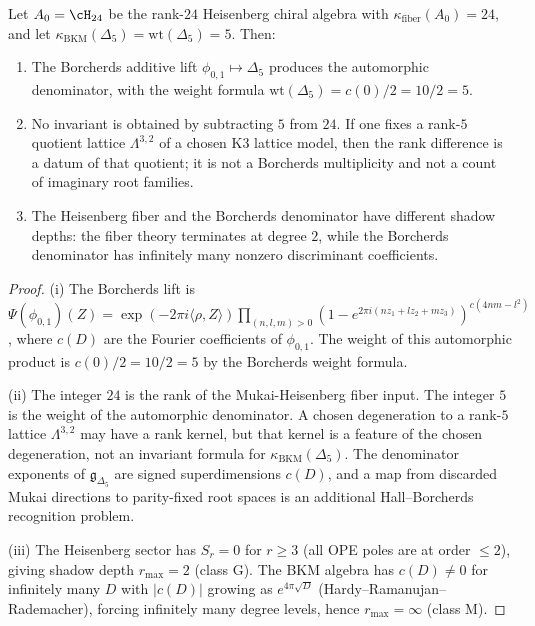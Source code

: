 \begin{proposition}
\label{prop:k3e-fiber-global}
Let $A_0 = \cH_{24}$ be the rank-$24$ Heisenberg chiral algebra with $\kappa_{\mathrm{fiber}}(A_0) = 24$, and let $\kappa_{\mathrm{BKM}}(\Delta_5) = \mathrm{wt}(\Delta_5) = 5$. Then:
\begin{enumerate}[label=(\roman*)]
 \item The Borcherds additive lift $\phi_{0,1} \mapsto \Delta_5$ produces the automorphic denominator, with the weight formula $\mathrm{wt}(\Delta_5) = c(0)/2 = 10/2 = 5$.
 \item No invariant is obtained by subtracting $5$ from $24$. If one fixes a rank-$5$ quotient lattice $\Lambda^{3,2}$ of a chosen K3 lattice model, then the rank difference is a datum of that quotient; it is not a Borcherds multiplicity and not a count of imaginary root families.
 \item The Heisenberg fiber and the Borcherds denominator have different shadow depths: the fiber theory terminates at degree $2$, while the Borcherds denominator has infinitely many nonzero discriminant coefficients.
\end{enumerate}
\end{proposition}

\begin{proof}
(i) The Borcherds lift is $\Psi(\phi_{0,1})(Z) = \exp(-2\pi i \langle \rho, Z \rangle) \prod_{(n,l,m) > 0}(1 - e^{2\pi i(nz_1 + lz_2 + mz_3)})^{c(4nm - l^2)}$, where $c(D)$ are the Fourier coefficients of $\phi_{0,1}$. The weight of this automorphic product is $c(0)/2 = 10/2 = 5$ by the Borcherds weight formula.

(ii) The integer $24$ is the rank of the Mukai-Heisenberg fiber input. The integer $5$ is the weight of the automorphic denominator. A chosen degeneration to a rank-$5$ lattice $\Lambda^{3,2}$ may have a rank kernel, but that kernel is a feature of the chosen degeneration, not an invariant formula for $\kappa_{\mathrm{BKM}}(\Delta_5)$. The denominator exponents of $\mathfrak{g}_{\Delta_5}$ are signed superdimensions $c(D)$, and a map from discarded Mukai directions to parity-fixed root spaces is an additional Hall--Borcherds recognition problem.

(iii) The Heisenberg sector has $S_r = 0$ for $r \geq 3$ (all OPE poles are at order $\leq 2$), giving shadow depth $r_{\max} = 2$ (class G). The BKM algebra has $c(D) \neq 0$ for infinitely many $D$ with $|c(D)|$ growing as $e^{4\pi\sqrt{D}}$ (Hardy--Ramanujan--Rademacher), forcing infinitely many degree levels, hence $r_{\max} = \infty$ (class M).
\end{proof}


